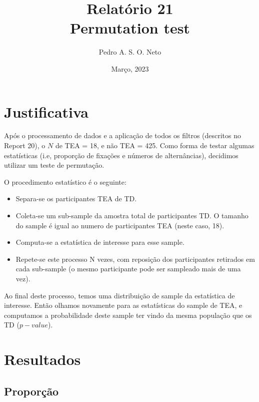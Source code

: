\documentclass{article}
\title{Relatório 21 \\ Permutation test}
\author{Pedro A. S. O. Neto}
\date{Março, 2023}
\begin{document}
\maketitle

\section{Justificativa}

Após o processamento de dados e a aplicação de todos os filtros (descritos no Report 20), o $N$ de TEA = 18, e não TEA = 425.
Como forma de testar algumas estatísticas (i.e, proporção de fixações e números de alternâncias), decidimos utilizar um teste de permutação.

O procedimento estatístico é o seguinte:
\begin{itemize}
  \item Separa-se os participantes TEA de TD.
  \item Coleta-se um sub-sample da amostra total de participantes TD. O tamanho do sample é igual ao numero de participantes TEA (neste caso, 18).
  \item Computa-se a estatística de interesse para esse sample.
  \item Repete-se este processo N vezes, com reposição dos participantes retirados em cada sub-sample (o mesmo participante pode ser sampleado mais de uma vez).
\end{itemize}

Ao final deste processo, temos uma distribuição de sample da estatística de interesse. Então olhamos novamente para as estatísticas do sample de TEA, e computamos a probabilidade deste sample ter vindo da mesma população que os TD ($p-value$).

\section{Resultados}
\subsection{Proporção}
\end{document}
